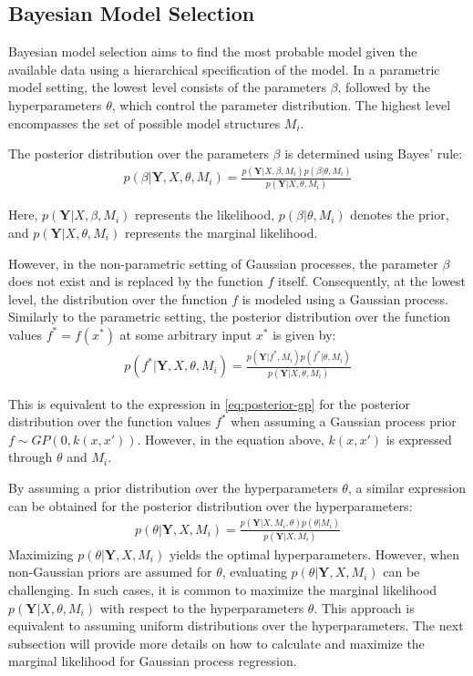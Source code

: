 \subsection{Bayesian Model Selection}

Bayesian model selection aims to find the most probable model given the available data
using a hierarchical specification of the model.
In a parametric model setting, the lowest level consists of the parameters $\beta$,
followed by the hyperparameters $\theta$, which control the parameter distribution.
The highest level encompasses the set of possible model structures $M_i$.

The posterior distribution over the parameters $\beta$ is determined using Bayes' rule:
\begin{gather*}
    p(\beta | \mathbf{Y}, X, \theta, M_i) = \frac{p( \mathbf{Y}| X, \beta,
        M_i)p(\beta|\theta, M_i)}{p(\mathbf{Y}|X, \theta, M_i)}
\end{gather*}

Here, $p(\mathbf{Y} | X, \beta, M_i)$ represents the likelihood, $p(\beta | \theta, M_i)$ denotes the prior,
and $p(\mathbf{Y} | X, \theta, M_i)$ represents the marginal likelihood.


However, in the non-parametric setting of Gaussian processes, the parameter $\beta$ does not exist and is
replaced by the function $f$ itself.
Consequently, at the lowest level, the distribution over the function $f$ is modeled using a Gaussian process.
Similarly to the parametric setting, the posterior distribution over the function values
$f^{\ast} = f(x^{\ast})$ at some arbitrary input $x^{\ast}$ is given by:
\begin{gather*}
    p(f^{\ast} | \mathbf{Y}, X, \theta, M_i) = \frac{p( \mathbf{Y}| f^{\ast}, M_i)p(f^{\ast} | \theta, M_i)}{p(\mathbf{Y}|X, \theta, M_i)}
\end{gather*}

This is equivalent to the expression in \ref{eq:posterior-gp} for the posterior distribution over the
function values $f^{\ast}$ when assuming a Gaussian process prior $f \sim GP(0, k(x,x'))$.
However, in the equation above, $k(x,x')$ is expressed through $\theta$ and $M_i$.

By assuming a prior distribution over the hyperparameters $\theta$, a similar expression can be obtained for
the posterior distribution over the hyperparameters:
\begin{gather*}
    p(\theta | \mathbf{Y}, X, M_i) = \frac{p( \mathbf{Y}| X,M_i, \theta)
        p(\theta| M_i)}{p(\mathbf{Y}|X, M_i)}
\end{gather*}
Maximizing $p(\theta | \mathbf{Y}, X, M_i)$ yields the optimal hyperparameters.
However, when non-Gaussian priors are assumed for $\theta$, evaluating $p(\theta | \mathbf{Y}, X, M_i)$
can be challenging.
In such cases, it is common to maximize the marginal likelihood $p(\mathbf{Y} | X, \theta, M_i)$
with respect to the hyperparameters $\theta$.
This approach is equivalent to assuming uniform distributions over the hyperparameters.
The next subsection will provide more details on how to calculate and maximize the
marginal likelihood for Gaussian process regression.


